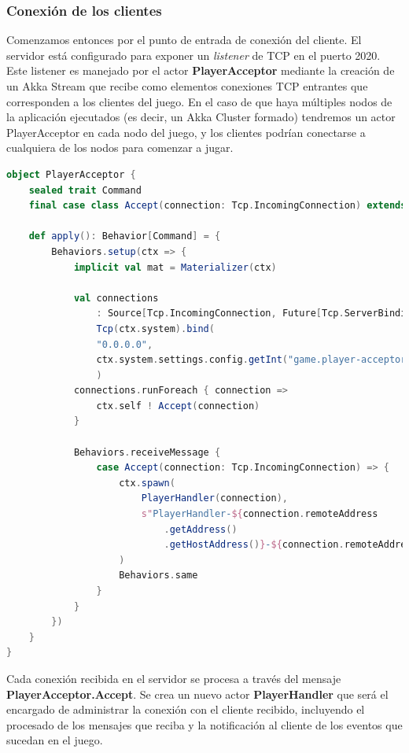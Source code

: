 \subsubsection{Conexión de los clientes}

\noindent Comenzamos entonces por el punto de entrada de conexión del cliente. El servidor está configurado para exponer un \textit{listener} de TCP en el puerto 2020.
Este listener es manejado por el actor \textbf{PlayerAcceptor} mediante la creación de un Akka Stream que recibe como elementos
conexiones TCP entrantes que corresponden a los clientes del juego. En el caso de que haya múltiples nodos de la aplicación ejecutados (es decir, un Akka Cluster
formado) tendremos un actor PlayerAcceptor en cada nodo del juego, y los clientes podrían conectarse a cualquiera de los nodos para comenzar a jugar.

\begin{lstlisting}[language=Scala, caption={\textbf{Actor PlayerAcceptor}}]
object PlayerAcceptor {
    sealed trait Command
    final case class Accept(connection: Tcp.IncomingConnection) extends Command

    def apply(): Behavior[Command] = {
        Behaviors.setup(ctx => {
            implicit val mat = Materializer(ctx)

            val connections
                : Source[Tcp.IncomingConnection, Future[Tcp.ServerBinding]] =
                Tcp(ctx.system).bind(
                "0.0.0.0",
                ctx.system.settings.config.getInt("game.player-acceptor.port")
                )
            connections.runForeach { connection =>
                ctx.self ! Accept(connection)
            }

            Behaviors.receiveMessage {
                case Accept(connection: Tcp.IncomingConnection) => {
                    ctx.spawn(
                        PlayerHandler(connection),
                        s"PlayerHandler-${connection.remoteAddress
                            .getAddress()
                            .getHostAddress()}-${connection.remoteAddress.getPort()}"
                    )
                    Behaviors.same
                }
            }
        })
    }
}
\end{lstlisting}

Cada conexión recibida en el servidor se procesa a través del mensaje \textbf{PlayerAcceptor.Accept}.
Se crea un nuevo actor \textbf{PlayerHandler} que será el encargado de administrar la conexión con el cliente recibido, incluyendo
el procesado de los mensajes que reciba y la notificación al cliente de los eventos que sucedan en el juego.

